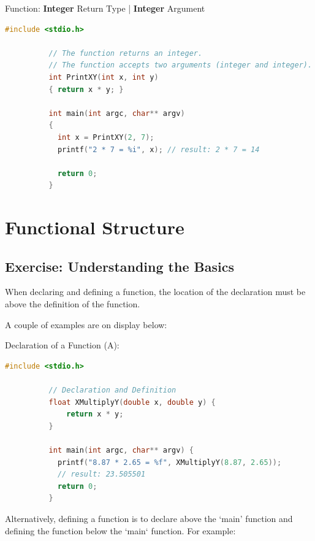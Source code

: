 \documentclass[10pt]{article}
\begin{document}
      \begin{example}{Function: \textbf{Integer} Return Type | \textbf{Integer} Argument}
        \begin{lstlisting}[language=c]
          #include <stdio.h>

          // The function returns an integer.
          // The function accepts two arguments (integer and integer).
          int PrintXY(int x, int y)
          { return x * y; }

          int main(int argc, char** argv)
          {
            int x = PrintXY(2, 7);
            printf("2 * 7 = %i", x); // result: 2 * 7 = 14

            return 0;
          }
        \end{lstlisting}
      \end{example}

\newpage
\section{Functional Structure}
\label{sec:functional-structure}
    \subsection{Exercise: Understanding the Basics}
      When declaring and defining a function, the location of the declaration must be above the definition of the function.
      
      A couple of examples are on display below:

      \begin{example}{Declaration of a Function (A):}
        \begin{lstlisting}[language=c]
          #include <stdio.h>

          // Declaration and Definition
          float XMultiplyY(double x, double y) {
              return x * y;
          }

          int main(int argc, char** argv) {
            printf("8.87 * 2.65 = %f", XMultiplyY(8.87, 2.65)); 
            // result: 23.505501
            return 0;
          }
        \end{lstlisting}
      \end{example}

      Alternatively, defining a function is to declare above the `main' function and defining the function below the `main` function. For example:
\end{document}
